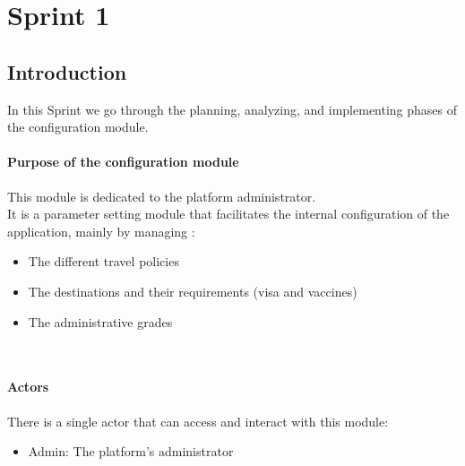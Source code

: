 \chapter{Sprint 1}

\section*{Introduction}
In this Sprint we go through the planning, analyzing, and implementing phases of the configuration module.
\subsubsection*{Purpose of the configuration module}
This module is dedicated to the platform administrator. \\
It is a parameter setting module that facilitates the internal configuration of the application, mainly by managing :\\
\begin{itemize}
    \item The different travel policies
    \item The destinations and their requirements (visa and vaccines)
    \item The administrative grades
\end{itemize}\\
\subsubsection*{Actors}
There is a single actor that can access and interact with this module:
\begin{itemize}
    \item Admin: The platform's administrator
\end{itemize}\\
